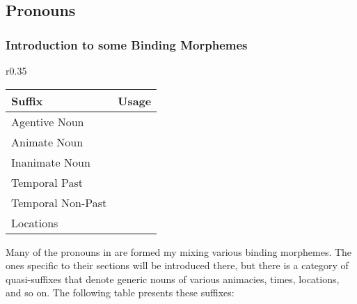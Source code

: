   \subsection{Pronouns}
    \subsubsection{Introduction to some Binding Morphemes}
    \begin{wrapfigure}{r}{0.35\textwidth}
      \begin{tabular}{|l|l|}
        \hline
        Suffix            & Usage                        \\ \hline \hline
        Agentive Noun     & \suffixtext{\agtsuffix}      \\
        Animate Noun      & \suffixtext{\animsuffix}     \\
        Inanimate Noun    & \suffixtext{\inansuffix}     \\
        Temporal Past     & \suffixtext{\pastsuffix}     \\
        Temporal Non-Past & \suffixtext{\nonpastsuffix}  \\
        Locations         & \suffixtext{\locationsuffix} \\ \hline
      \end{tabular}
    \end{wrapfigure}
    Many of the pronouns in \langname are formed my mixing various binding morphemes. The ones specific to their sections will be introduced there, but there is a category of quasi-suffixes that denote generic nouns of various animacies, times, locations, and so on. The following table presents these suffixes:
    \vertspace

